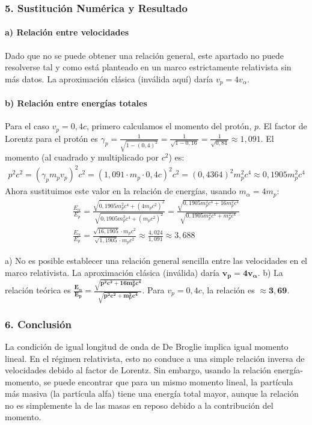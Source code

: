 \subsubsection*{5. Sustitución Numérica y Resultado}
\paragraph*{a) Relación entre velocidades}
Dado que no se puede obtener una relación general, este apartado no puede resolverse tal y como está planteado en un marco estrictamente relativista sin más datos. La aproximación clásica (inválida aquí) daría $v_p=4v_\alpha$.

\paragraph*{b) Relación entre energías totales}
Para el caso $v_p = 0,4c$, primero calculamos el momento del protón, $p$.
El factor de Lorentz para el protón es $\gamma_p = \frac{1}{\sqrt{1 - (0,4)^2}} = \frac{1}{\sqrt{1 - 0,16}} = \frac{1}{\sqrt{0,84}} \approx 1,091$.
El momento (al cuadrado y multiplicado por $c^2$) es:
\begin{gather}
    p^2c^2 = (\gamma_p m_p v_p)^2 c^2 = (1,091 \cdot m_p \cdot 0,4c)^2 c^2 = (0,4364)^2 m_p^2 c^4 \approx 0,1905 m_p^2 c^4
\end{gather}
Ahora sustituimos este valor en la relación de energías, usando $m_\alpha = 4m_p$:
\begin{gather}
    \frac{E_\alpha}{E_p} = \frac{\sqrt{0,1905 m_p^2 c^4 + (4m_p c^2)^2}}{\sqrt{0,1905 m_p^2 c^4 + (m_p c^2)^2}} = \frac{\sqrt{0,1905 m_p^2 c^4 + 16 m_p^2 c^4}}{\sqrt{0,1905 m_p^2 c^4 + m_p^2 c^4}} \nonumber \\
    \frac{E_\alpha}{E_p} = \frac{\sqrt{16,1905} \cdot m_p c^2}{\sqrt{1,1905} \cdot m_p c^2} \approx \frac{4,024}{1,091} \approx 3,688
\end{gather}
\begin{cajaresultado}
a) No es posible establecer una relación general sencilla entre las velocidades en el marco relativista. La aproximación clásica (inválida) daría $\boldsymbol{v_p = 4v_\alpha}$.
b) La relación teórica es $\boldsymbol{\frac{E_\alpha}{E_p} = \frac{\sqrt{p^2c^2 + 16m_p^2c^4}}{\sqrt{p^2c^2 + m_p^2c^4}}}$. Para $v_p=0,4c$, la relación es $\boldsymbol{\approx 3,69}$.
\end{cajaresultado}

\subsubsection*{6. Conclusión}
\begin{cajaconclusion}
La condición de igual longitud de onda de De Broglie implica igual momento lineal. En el régimen relativista, esto no conduce a una simple relación inversa de velocidades debido al factor de Lorentz. Sin embargo, usando la relación energía-momento, se puede encontrar que para un mismo momento lineal, la partícula más masiva (la partícula alfa) tiene una energía total mayor, aunque la relación no es simplemente la de las masas en reposo debido a la contribución del momento.
\end{cajaconclusion}

